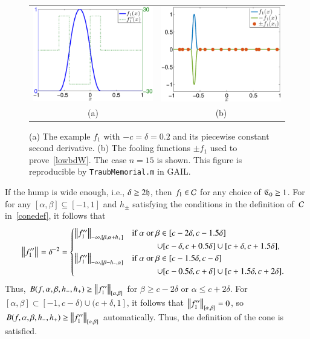 \documentclass[review]{elsarticle}
\theoremstyle{definition}
\begin{document}
\begin{figure}[tbh]
\centering
\begin{tabular}{cc}
\includegraphics[width=5.7cm]{figure/f3plot.eps}  
& \includegraphics[width=5.7cm]{figure/f3foolplot.eps}
\\[1ex] (a) & (b)
\end{tabular}
\caption{(a) The example $f_1$ with $-c=\delta = 0.2$ and its piecewise constant
second derivative. %
(b) The fooling functions $\pm f_1$ used to prove~\eqref{lowbdW}. The case
$n=15$ is shown.  
This figure is reproducible by {\tt TraubMemorial.m} in GAIL.}
\label{f3fig}
\end{figure}



If the hump is wide enough, i.e., $\delta \ge 2 \fh$, then $f_1 \in \cc$ for any
choice of $\fC_0 \ge 1$. For for any $[\alpha,\beta]\subseteq [-1,1]$ and
$h_{\pm}$ satisfying the conditions in the definition of~$\cc$ in~\eqref{conedef}, 
it follows that
\begin{align*}
    & \norm{f''_1} = \delta^{-2} =
\begin{cases}
\norm[-\infty,{[\beta,\alpha+h_+]}]{f''_1}  %
   & \text{if } \alpha\text{ or } \beta \in [c - 2\delta,  c - 1.5\delta]  
\\ & \qquad\quad \cup [c - \delta,  c + 0.5\delta] \cup [c + \delta, c+1.5\delta],
\\ \norm[-\infty,{[\beta - h_-,\alpha]}]{f''_1} %
   & \text{if } \alpha\text{ or } \beta \in [c - 1.5\delta,  c - \delta]
\\ & \qquad\quad  \cup [c - 0.5 \delta,  c + \delta] \cup [c + 1.5\delta, c+2\delta].
\end{cases}
\end{align*}
Thus, $B(f,\alpha,\beta,h_-,h_+)\ge\norm[{[\alpha,\beta]}]{f''_1}$ for $\beta
\ge c - 2\delta$ or $\alpha \le c + 2\delta$. For $[\alpha,\beta] \subset [-1,c
- \delta) \cup (c+\delta, 1]$, it follows that $\norm[{[\alpha,\beta]}]{f''_1} =
0$, so $B(f,\alpha,\beta,h_-,h_+)\ge\norm[{[\alpha,\beta]}]{f''_1}$
automatically. Thus, the definition of the cone is satisfied.
\end{document}
